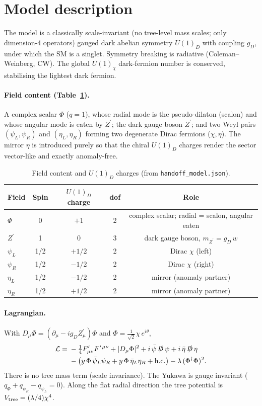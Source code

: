 \documentclass[11pt]{article}
\newcommand{\Zp}{Z^{\prime}}
\newcommand{\gD}{g_{D}}
\newcommand{\mZp}{m_{\Zp}}
\begin{document}
\section{Model description}
\label{sec:model}
The model is a classically scale-invariant (no tree-level mass scales; only dimension-4
operators) gauged dark abelian symmetry $U(1)_D$ with coupling $\gD$, under which the SM
is a singlet. Symmetry breaking is radiative (Coleman--Weinberg, CW). The global
$U(1)_\chi$ dark-fermion number is conserved, stabilising the lightest dark fermion.

\paragraph{Field content (Table~\ref{tab:fields}).}
A complex scalar $\Phi$ ($q=1$), whose radial mode is the pseudo-dilaton (scalon) and
whose angular mode is eaten by $\Zp$; the dark gauge boson $\Zp$; and two Weyl pairs
$(\psi_L,\psi_R)$ and $(\eta_L,\eta_R)$ forming two degenerate Dirac fermions
($\chi,\eta$). The mirror $\eta$ is introduced purely so that the chiral
$U(1)_D$ charges render the sector vector-like and exactly anomaly-free.

\begin{table}[h]
\centering
\small
\caption{Field content and $U(1)_D$ charges (from \texttt{handoff\_model.json}).}
\label{tab:fields}
\begin{tabular}{lcccc}
\toprule
Field & Spin & $U(1)_D$ charge & dof & Role \\
\midrule
$\Phi$    & 0   & $+1$  & 2 & complex scalar; radial = scalon, angular eaten \\
$\Zp$     & 1   & 0     & 3 & dark gauge boson, $\mZp=\gD\,w$ \\
$\psi_L$  & 1/2 & $+1/2$ & 2 & Dirac $\chi$ (left) \\
$\psi_R$  & 1/2 & $-1/2$ & 2 & Dirac $\chi$ (right) \\
$\eta_L$  & 1/2 & $-1/2$ & 2 & mirror (anomaly partner) \\
$\eta_R$  & 1/2 & $+1/2$ & 2 & mirror (anomaly partner) \\
\bottomrule
\end{tabular}
\end{table}

\paragraph{Lagrangian.}
With $D_\mu\Phi=(\partial_\mu-i\gD \Zp_\mu)\Phi$ and $\Phi=\tfrac{1}{\sqrt2}\chi\,e^{i\theta}$,
\begin{align}
\mathcal{L} =\;& -\tfrac14 F^{\prime}_{\mu\nu}F^{\prime\,\mu\nu}
 + |D_\mu\Phi|^2
 + i\,\bar\psi\,\slashed{D}\,\psi + i\,\bar\eta\,\slashed{D}\,\eta \nonumber\\
 & -\big(y\,\Phi\,\bar\psi_L\psi_R + y\,\Phi\,\bar\eta_L\eta_R + \mathrm{h.c.}\big)
 - \lambda\,(\Phi^\dagger\Phi)^2 .
\end{align}
There is no tree mass term (scale invariance). The Yukawa is gauge invariant
($q_\Phi+q_{\psi_R}-q_{\psi_L}=0$). Along the flat radial direction the tree potential is
$V_{\rm tree}=(\lambda/4)\chi^4$.
\end{document}
